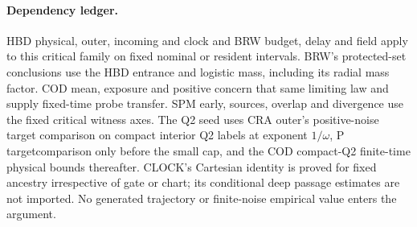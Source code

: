 \documentclass[11pt]{article}
\begin{document}
\paragraph{Dependency ledger.}
HBD physical, outer, incoming and clock and BRW budget, delay and
field apply to this critical family on fixed nominal or resident
intervals. BRW's protected-set conclusions use the HBD entrance
and logistic mass, including its radial mass factor. COD mean,
exposure and positive concern that same limiting law and supply
fixed-time probe transfer. SPM early, sources, overlap and divergence
use the fixed critical witness axes. The Q2 seed uses CRA outer's
positive-noise target comparison on compact interior Q2 labels
at exponent $1/\omega$, P targetcomparison only before the small cap,
and the COD compact-Q2 finite-time physical bounds thereafter.
CLOCK's Cartesian identity is proved for fixed ancestry irrespective
of gate or chart; its conditional deep passage estimates are not
imported. No generated trajectory or finite-noise empirical value
enters the argument.
\end{document}
